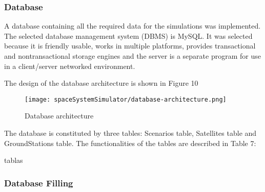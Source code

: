 \subsubsection{Database}

A database containing all the required data for the simulations was
implemented. The selected database management system (DBMS) is MySQL. It was
selected because it is friendly usable, works in multiple platforms, provides
transactional and nontransactional storage engines and the server is a separate program for use in a client/server networked environment. 

The design of the database architecture is shown in Figure 10

\begin{figure}[!h]
\begin{center}
\texttt{[image: spaceSystemSimulator/database-architecture.png]}
\caption{Database architecture}
\label{fig:sss-database-architecture}
\end{center}
\end{figure}

The database is constituted by three tables: Scenarios table, Satellites table
and GroundStations table. The functionalities of the tables are described in
Table 7:


tablas


\subsubsection{Database Filling}

